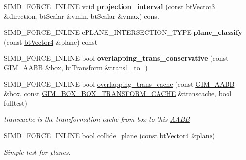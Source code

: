 \begin{DoxyCompactItemize}
\mbox{\label{classGIM__AABB_a7802bf10dabdbdb9f15ceefba6289466}} 
S\+I\+M\+D\+\_\+\+F\+O\+R\+C\+E\+\_\+\+I\+N\+L\+I\+NE void {\bfseries projection\+\_\+interval} (const bt\+Vector3 \&direction, bt\+Scalar \&vmin, bt\+Scalar \&vmax) const
\item 
\mbox{\label{classGIM__AABB_ad811957871e0428393603f9c7af21585}} 
S\+I\+M\+D\+\_\+\+F\+O\+R\+C\+E\+\_\+\+I\+N\+L\+I\+NE e\+P\+L\+A\+N\+E\+\_\+\+I\+N\+T\+E\+R\+S\+E\+C\+T\+I\+O\+N\+\_\+\+T\+Y\+PE {\bfseries plane\+\_\+classify} (const \hyperlink{classbtVector4}{bt\+Vector4} \&plane) const
\item 
\mbox{\label{classGIM__AABB_a9f15bee8c497a7c09221a07ad0f01695}} 
S\+I\+M\+D\+\_\+\+F\+O\+R\+C\+E\+\_\+\+I\+N\+L\+I\+NE bool {\bfseries overlapping\+\_\+trans\+\_\+conservative} (const \hyperlink{classGIM__AABB}{G\+I\+M\+\_\+\+A\+A\+BB} \&box, bt\+Transform \&trans1\+\_\+to\+\_)
\item 
\mbox{\label{classGIM__AABB_af4c6c48e03d316e74e00b2ab261fd125}} 
S\+I\+M\+D\+\_\+\+F\+O\+R\+C\+E\+\_\+\+I\+N\+L\+I\+NE bool \hyperlink{classGIM__AABB_af4c6c48e03d316e74e00b2ab261fd125}{overlapping\+\_\+trans\+\_\+cache} (const \hyperlink{classGIM__AABB}{G\+I\+M\+\_\+\+A\+A\+BB} \&box, const \hyperlink{classGIM__BOX__BOX__TRANSFORM__CACHE}{G\+I\+M\+\_\+\+B\+O\+X\+\_\+\+B\+O\+X\+\_\+\+T\+R\+A\+N\+S\+F\+O\+R\+M\+\_\+\+C\+A\+C\+HE} \&transcache, bool fulltest)
\begin{DoxyCompactList}\small\item\em transcache is the transformation cache from box to this \hyperlink{classAABB}{A\+A\+BB} \end{DoxyCompactList}\item 
\mbox{\label{classGIM__AABB_a05940e89bdd3fa59cc8cd3af6e1b876c}} 
S\+I\+M\+D\+\_\+\+F\+O\+R\+C\+E\+\_\+\+I\+N\+L\+I\+NE bool \hyperlink{classGIM__AABB_a05940e89bdd3fa59cc8cd3af6e1b876c}{collide\+\_\+plane} (const \hyperlink{classbtVector4}{bt\+Vector4} \&plane)
\begin{DoxyCompactList}\small\item\em Simple test for planes. \end{DoxyCompactList}\item 
\mbox{\label{classGIM__AABB_a4a1ffa196d3981313fccf9e01aa383f9}} 

\end{DoxyCompactItemize}
